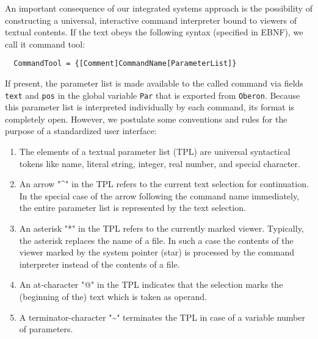 An important consequence of our integrated systems approach is the possibility of constructing
a universal, interactive command interpreter bound to viewers of textual contents. If the text
obeys the following syntax (specified in EBNF), we call it command tool:
\begin{verbatim}
  CommandTool = {[Comment]CommandName[ParameterList]}
\end{verbatim}
If present, the parameter list is made available to the called command via fields \verb|text|
and \verb|pos| in the global variable \verb|Par| that is exported from \verb|Oberon|. Because
this parameter list is interpreted individually by each command, its format is completely open.
However, we postulate some conventions and rules for the purpose of a standardized user interface:
\begin{enumerate}
  \item The elements of a textual parameter list (TPL) are universal syntactical tokens
    like name, literal string, integer, real number, and special character.
  \item An arrow "\^{}" in the TPL refers to the current text selection for continuation.
    In the special case of the arrow following the command name immediately,
    the entire parameter list is represented by the text selection.
  \item An asterisk "*" in the TPL refers to the currently marked viewer.
    Typically, the asterisk replaces the name of a file.
    In such a case the contents of the viewer marked by the system pointer (star)
    is processed by the command interpreter instead of the contents of a file.
  \item An at-character "@" in the TPL indicates that the selection
    marks the (beginning of the) text which is taken as operand.
  \item A terminator-character "\~{}" terminates the TPL in case of a variable number of parameters.
\end{enumerate}

